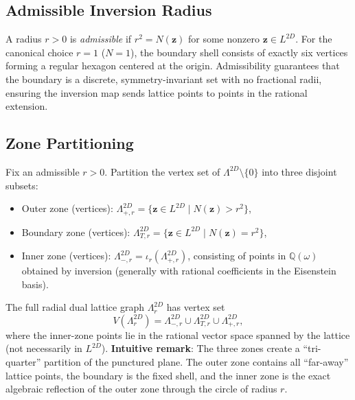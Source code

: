 \documentclass{article}
\begin{document}
\subsection{Admissible Inversion Radius}
A radius \(r > 0\) is \emph{admissible} if \(r^2 = N(\mathbf{z})\) for some nonzero \(\mathbf{z} \in L^{2D}\). For the canonical choice \(r=1\) (\(N=1\)), the boundary shell consists of exactly six vertices forming a regular hexagon centered at the origin. Admissibility guarantees that the boundary is a discrete, symmetry-invariant set with no fractional radii, ensuring the inversion map sends lattice points to points in the rational extension.
\subsection{Zone Partitioning}
Fix an admissible \(r > 0\). Partition the vertex set of \(\Lambda^{2D} \setminus \{0\}\) into three disjoint subsets:
\begin{itemize}
  \item Outer zone (vertices): \(\Lambda_{+,r}^{2D} = \{ \mathbf{z} \in L^{2D} \mid N(\mathbf{z}) > r^2 \}\),
  \item Boundary zone (vertices): \(\Lambda_{T,r}^{2D} = \{ \mathbf{z} \in L^{2D} \mid N(\mathbf{z}) = r^2 \}\),
  \item Inner zone (vertices): \(\Lambda_{-,r}^{2D} = \iota_r(\Lambda_{+,r}^{2D})\), consisting of points in \(\mathbb{Q}(\omega)\) obtained by inversion (generally with rational coefficients in the Eisenstein basis).
\end{itemize}
The full radial dual lattice graph \(\Lambda_r^{2D}\) has vertex set
\[
V(\Lambda_r^{2D}) = \Lambda_{-,r}^{2D} \cup \Lambda_{T,r}^{2D} \cup \Lambda_{+,r}^{2D},
\]
where the inner-zone points lie in the rational vector space spanned by the lattice (not necessarily in \(L^{2D}\)).
\textbf{Intuitive remark}: The three zones create a “tri-quarter” partition of the punctured plane. The outer zone contains all “far-away” lattice points, the boundary is the fixed shell, and the inner zone is the exact algebraic reflection of the outer zone through the circle of radius \(r\).
\end{document}
